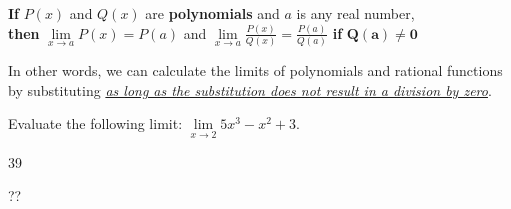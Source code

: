 \begin{tcolorbox}[title = {Limits of Polynomial and Rational Functions}]

\begin{center}
\textbf{If} $P(x)$ and $Q(x)$ are \textbf{polynomials} and $a$ is any real number,\\
\textbf{then} \(\lim\limits_{x \to a} P(x)=P(a)\) and \(\lim\limits_{x \to a} \displaystyle\frac{P(x)}{Q(x)}=\displaystyle\frac{P(a)}{Q(a)}\) \textbf{if} \(\bm{Q(a)\ne 0}\)
\end{center}
In other words, we can calculate the limits of polynomials and rational functions by
substituting \underline{\emph{as long as the substitution does not result in a division by zero}}.
\end{tcolorbox}
\vspace{-0.5cm}
\begin{example}
Evaluate the following limit: \(\lim\limits_{x \to 2} 5x^3-x^2+3\).
    \begin{sol}
    39
    \end{sol}
    \begin{solL}
    ??
    
    \end{solL}
    
\end{example}
\vspace{0.6 in}

